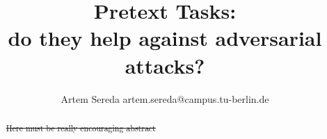 \documentclass[12pt]{extarticle}
\title{
    Pretext Tasks: \\
    do they help against adversarial attacks?
}
\author{Artem Sereda artem.sereda@campus.tu-berlin.de}
\begin{document}
    \maketitle

    \begin{abstract}
        \st{Here must be really encouraging abstract}
    \end{abstract}


    
    
    


    \printbibliography
\end{document}
